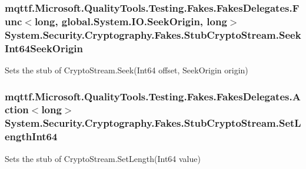 \hypertarget{class_system_1_1_security_1_1_cryptography_1_1_fakes_1_1_stub_crypto_stream_abbd6f55d8ce4b3f8385a58a6ee74b775}{
\subsubsection[{Seek\-Int64\-Seek\-Origin}]{\setlength{\rightskip}{0pt plus 5cm}mqttf.\-Microsoft.\-Quality\-Tools.\-Testing.\-Fakes.\-Fakes\-Delegates.\-Func$<$long, global.\-System.\-I\-O.\-Seek\-Origin, long$>$ System.\-Security.\-Cryptography.\-Fakes.\-Stub\-Crypto\-Stream.\-Seek\-Int64\-Seek\-Origin}}\label{class_system_1_1_security_1_1_cryptography_1_1_fakes_1_1_stub_crypto_stream_abbd6f55d8ce4b3f8385a58a6ee74b775}


Sets the stub of Crypto\-Stream.\-Seek(\-Int64 offset, Seek\-Origin origin)

\hypertarget{class_system_1_1_security_1_1_cryptography_1_1_fakes_1_1_stub_crypto_stream_a1c21fe454e944fe43a484f795e996b3f}{
\subsubsection[{Set\-Length\-Int64}]{\setlength{\rightskip}{0pt plus 5cm}mqttf.\-Microsoft.\-Quality\-Tools.\-Testing.\-Fakes.\-Fakes\-Delegates.\-Action$<$long$>$ System.\-Security.\-Cryptography.\-Fakes.\-Stub\-Crypto\-Stream.\-Set\-Length\-Int64}}\label{class_system_1_1_security_1_1_cryptography_1_1_fakes_1_1_stub_crypto_stream_a1c21fe454e944fe43a484f795e996b3f}


Sets the stub of Crypto\-Stream.\-Set\-Length(\-Int64 value)

